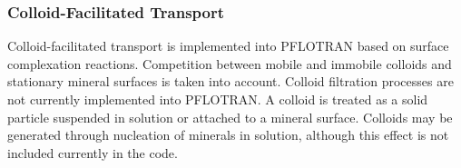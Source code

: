 \subsubsection{Colloid-Facilitated Transport}

Colloid-facilitated transport is implemented into PFLOTRAN based on surface complexation reactions. Competition between mobile and immobile colloids and stationary mineral surfaces is taken into account. Colloid filtration processes are not currently implemented into PFLOTRAN. 
A colloid is treated as a solid particle suspended in solution or attached to a mineral surface. Colloids may be generated through nucleation of minerals in solution, although this effect is not included currently in the code.

